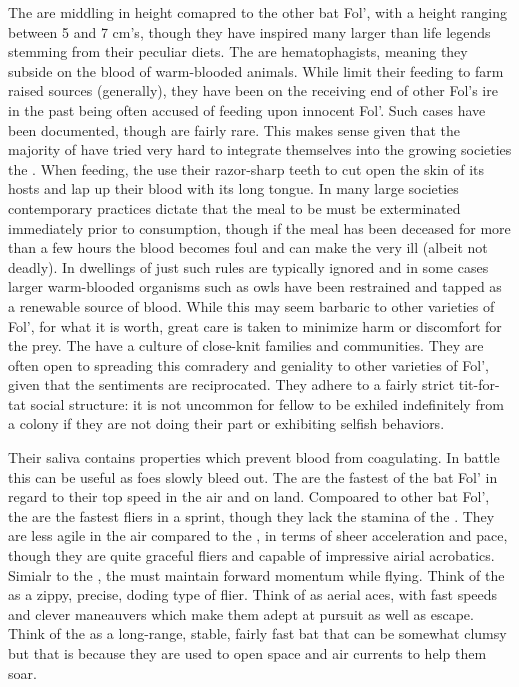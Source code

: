 \documentclass[twoside, 12pt, letterpaper]{report}\usepackage[]{graphicx}\usepackage[]{color}
\begin{document}
\begin{multicols*}{2}
\nsubsection{\vmbat}
The \vmbat are middling in height comapred to the other bat Fol', with a height ranging between 5 and 7 cm's, though they have inspired many larger than life legends stemming from their peculiar diets. The \vmbat are hematophagists, meaning they subside on the blood of warm-blooded animals. While \vmbat limit their feeding to farm raised sources (generally), they have been on the receiving end of other Fol's ire in the past being often accused of feeding upon innocent Fol'. Such cases have been documented, though are fairly rare. This makes sense given that the majority of \vmbat have tried very hard to integrate themselves into the growing societies \ooi the \mw. When feeding, the \vmbat use their razor-sharp teeth to cut open the skin of its hosts and lap up their blood with its long tongue. In many large societies contemporary practices dictate that the meal to be must be exterminated immediately prior to consumption, though if the meal has been deceased for more than a few hours the blood becomes foul and can make the \vmbat very ill (albeit not deadly). In dwellings of just \vmbat such rules are typically ignored and in some cases larger warm-blooded organisms such as owls have been restrained and tapped as a renewable source of blood. While this may seem barbaric to other varieties of Fol', for what it is worth, great care is taken to minimize harm or discomfort for the prey. The \vmbat have a culture of close-knit families and communities. They are often open to spreading this comradery and geniality to other varieties of Fol', given that the sentiments are reciprocated. They adhere to a fairly strict tit-for-tat social structure: it is not uncommon for fellow \vmbat to be exhiled indefinitely from a colony if they are not doing their part or exhibiting selfish behaviors. 

Their saliva contains properties which prevent blood from coagulating. In battle this can be useful as foes slowly bleed out. The \vmbat are the fastest of the bat Fol' in regard to their top speed in the air and on land. Compoared to other bat Fol', the \vmbat are the fastest fliers in a sprint, though they lack the stamina of the \ftbat. They are less agile in the air compared to the \hnbat, in terms of sheer acceleration and pace, though they are quite graceful fliers and capable of impressive airial acrobatics. Simialr to the \hnbat, the \vmbat must maintain forward momentum while flying. Think of the \hnbat as a zippy, precise, doding type of flier. Think of \vmbat as aerial aces, with fast speeds and clever maneauvers which make them adept at pursuit as well as escape. Think of the \ftbat as a long-range, stable, fairly fast bat that can be somewhat clumsy but that is because they are used to open space and air currents to help them soar. 


\end{multicols*}
\end{document}
